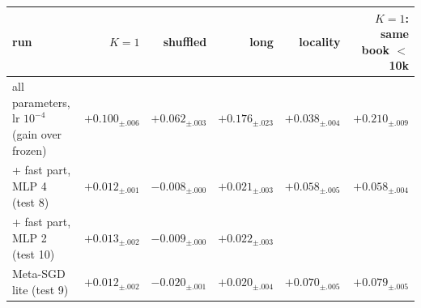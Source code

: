 \begin{tabular}{lrrrrr}
\toprule
run & $K=1$ & shuffled & long & locality & $K=1$: same book $<$10k \\
\midrule
all parameters, lr $10^{-4}$ (gain over frozen) & $+0.100_{\pm .006}$ & $+0.062_{\pm .003}$ & $+0.176_{\pm .023}$ & $+0.038_{\pm .004}$ & $+0.210_{\pm .009}$ \\
+ fast part, MLP 4 (test 8) & $+0.012_{\pm .001}$ & $-0.008_{\pm .000}$ & $+0.021_{\pm .003}$ & $+0.058_{\pm .005}$ & $+0.058_{\pm .004}$ \\
+ fast part, MLP 2 (test 10) & $+0.013_{\pm .002}$ & $-0.009_{\pm .000}$ & $+0.022_{\pm .003}$ &  &  \\
Meta-SGD lite (test 9) & $+0.012_{\pm .002}$ & $-0.020_{\pm .001}$ & $+0.020_{\pm .004}$ & $+0.070_{\pm .005}$ & $+0.079_{\pm .005}$ \\
\bottomrule
\end{tabular}
